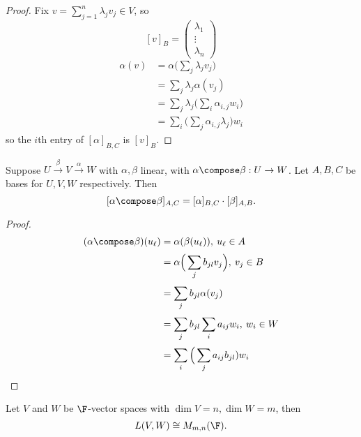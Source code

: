 \documentclass[a4paper]{article}
\theoremstyle{definition}
\begin{document}
\begin{proof}
  Fix \(v =\sum_{j=1}^{n}\lambda_jv_j \in V\), so
  \[
[v]_B =
\begin{pmatrix}
  \lambda_1 \\
  \vdots \\
  \lambda_n
\end{pmatrix}
\]
\begin{align*}
  \alpha(v) &= \alpha\Big( \sum_{j}^{ }\lambda_jv_j \Big) \\
            &= \sum_{j}^{ }\lambda_j\alpha(v_j) \\
            &= \sum_{j}^{ }\lambda_j\Big( \sum_{i}^{ }\alpha_{i,j}w_i \Big) \\
            &= \sum_{i}^{ }\Big( \sum_{j}^{} \alpha_{i,j}\lambda_j \Big) w_i
\end{align*}
so the \(i\)th entry of \([\alpha]_{B,C}\) is \([v]_B\).
\end{proof}

\begin{lem}
  Suppose \(U \stackrel{\beta}{\to} V \stackrel{\alpha}{\to} W\) with \(\alpha, \beta\) linear, with \(\alpha\compose\beta: U\to W\). Let \(A, B,C\) be bases for \(U,V,W\) respectively. Then
  \[
[\alpha\compose\beta]_{A,C} = [\alpha]_{B,C}\cdot[\beta]_{A,B}.
  \]
\end{lem}

\begin{proof}
  \begin{align*}
    (\alpha\compose\beta)(u_\ell) &= \alpha(\beta(u_\ell)), \: u_\ell\in A\\
                                  &= \alpha\Big( \sum_{j}^{ }b_{jl}v_j \Big), \: v_j\in B \\
                                  &= \sum_{j}^{ }b_{jl}\alpha(v_j) \\
                                  &= \sum_{j}^{ }b_{jl}\sum_{i}^{ }a_{ij}w_i, \: w_i\in W \\
                                  &= \sum_{i}^{ }\Big( \sum_{j}^{ }a_{ij}b_{jl})w_i
  \end{align*}
\end{proof}

\begin{prop}
  Let \(V\) and \(W\) be \(\F\)-vector spaces with \(\dim V = n, \dim W = m\), then
  \[
L(V,W) \cong M_{m,n}(\F).
  \]
\end{prop}
\end{document}
